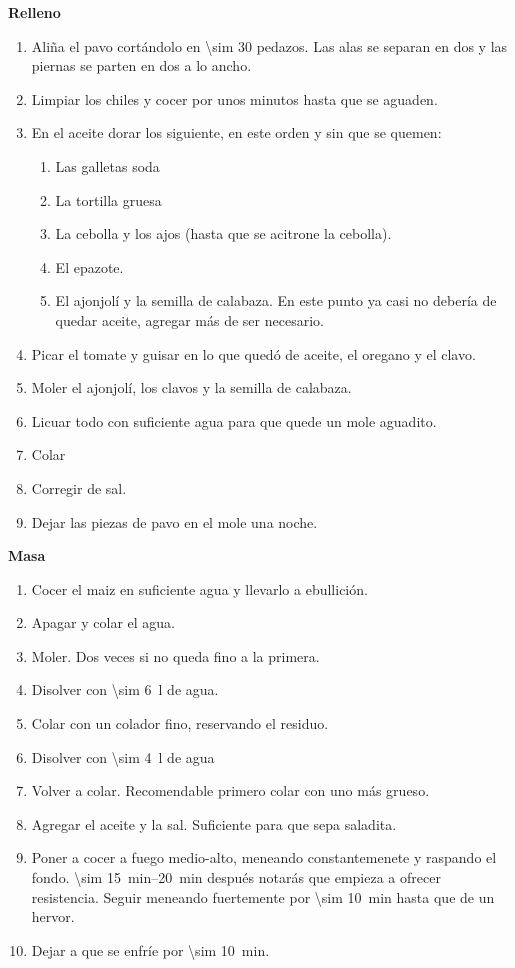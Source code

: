\textbf{Relleno}
\begin{enumerate}
\item Aliña el pavo cortándolo en \num{\sim 30} pedazos. Las alas se separan en dos y las piernas se parten en dos a lo ancho. 
\item Limpiar los chiles y cocer por unos minutos hasta que se aguaden.
\item En el aceite dorar los siguiente, en este orden y sin que se quemen:
\begin{enumerate}
\item Las galletas soda
\item La tortilla gruesa
\item La cebolla y los ajos (hasta que se acitrone la cebolla).
\item El epazote.
\item El ajonjolí y la semilla de calabaza. En este punto ya casi no debería de quedar aceite, agregar más de ser necesario.
\end{enumerate}
\item Picar el tomate y guisar en lo que quedó de aceite, el oregano y el clavo.
\item Moler el ajonjolí, los clavos y la semilla de calabaza.
\item Licuar todo con suficiente agua para que quede un mole aguadito.
\item Colar
\item Corregir de sal.
\item Dejar las piezas de pavo en el mole una noche.
\end{enumerate}

\textbf{Masa}
\begin{enumerate}
\item Cocer el maiz en suficiente agua y llevarlo a ebullición.
\item Apagar y colar el agua.
\item Moler. Dos veces si no queda fino a la primera.
\item Disolver con \SI{\sim 6}{l} de agua.
\item Colar con un colador fino, reservando el residuo.
\item Disolver con \SI{\sim 4}{l} de agua
\item Volver a colar. Recomendable primero colar con uno más grueso.
\item Agregar el aceite y la sal. Suficiente para que sepa saladita.
\item Poner a cocer a fuego medio-alto, meneando constantemenete y raspando el fondo. \SIrange{\sim 15}{20}{min} después notarás que empieza a ofrecer resistencia. Seguir meneando fuertemente por \SI{\sim 10}{min} hasta que de un hervor.
\item Dejar a que se enfríe por \SI{\sim 10}{min}.
\end{enumerate}

